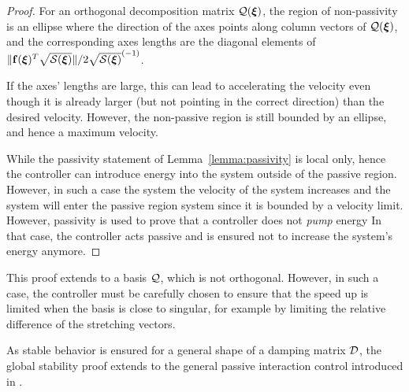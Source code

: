 \begin{proof}
For an orthogonal decomposition matrix $\mathcal{Q}(\boldsymbol{{\boldsymbol{\xi}}})$, the region of non-passivity is an ellipse where the direction of the axes points along column vectors of $\mathcal{Q}({\boldsymbol{\xi}})$, and the corresponding axes lengths are the diagonal elements of $\| \mathbf{f}({\boldsymbol{\xi}})^T \sqrt{\mathcal{S}({\boldsymbol{\xi}})}\| / 2 \sqrt{\mathcal{S}({\boldsymbol{\xi}})}^{(-1)}$. 

If the axes' lengths are large, this can lead to accelerating the velocity even though it is already larger (but not pointing in the correct direction) than the desired velocity. However, the non-passive region is still bounded by an ellipse, and hence a maximum velocity.

While the passivity statement of Lemma~\ref{lemma:passivity} is local only, hence the controller can introduce energy into the system outside of the passive region. However, in such a case the system the velocity of the system increases and the system will enter the passive region system since it is bounded by a velocity limit.
However, passivity is used to prove that a controller does not \textit{pump} energy In that case, the controller acts passive and is ensured not to increase the system's energy anymore.
\end{proof}

This proof extends to a basis $\mathcal{Q}$, which is not orthogonal. However, in such a case, the controller must be carefully chosen to ensure that the speed up is limited when the basis is close to singular, for example by limiting the relative difference of the stretching vectors.

As stable behavior is ensured for a general shape of a damping matrix $\mathcal{D}$, the global stability proof extends to the general passive interaction control introduced in \cite{kronander2015passive}.

